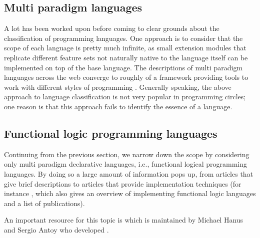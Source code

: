 \documentclass[thesis-solanki.tex]{subfiles}
\begin{document}
\subsection{Multi paradigm languages}

A lot has been worked upon before coming to clear grounds about the classification of programming languages.
One approach is to consider that the scope of each language is pretty much infinite, as small extension modules
that replicate different feature sets not naturally native to the language itself can be implemented on top of the
base language.
The descriptions of multi paradigm languages across the web
\cite{website:wikimultiparadigm,website:mdn,website:blogc2} converge to roughly of a framework providing tools to
work with different styles of programming \cite{website:wikimpllist,website:dmoz}.
Generally speaking, the above approach to language classification is not very popular in programming circles; one
reason is that this approach fails to identify the essence of a language.

\subsection{Functional logic programming languages}

Continuing from the previous section, we narrow down the scope by considering only multi paradigm declarative
languages, i.e., functional logical programming languages.
By doing so a large amount of information pops up, from articles that give brief descriptions
\cite{website:wikiflpl, website:wikiflpllist} to articles that provide implementation techniques (for instance
\cite{website:imlpementingflpl}, which also gives an overview of implementing functional logic languages and a list
of publications).

\begin{comment}
  The important piece however is the fact that there is a dedicated website \cite{website:funclogprog} for the
  history, research and development, existing languages, the literature, the contacts and everything else that one
  can think of for functional logic languages.
\end{comment}
An important resource for this topic is \cite{website:funclogprog} which is maintained by Michael Hanus
\cite{website:mhanus} and Sergio Antoy \cite{website:santoy} who developed  \cite{hanus1995curry}.

\begin{comment}
As a matter of fact the holy grail of information is maintained by two of the most important people in the field
Michael Hanus \cite{website:mhanus} and Sergio Antoy \cite{website:santoy}.
\end{comment}
\end{document}
